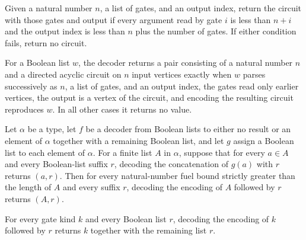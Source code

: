 \begin{definition}
\label{BoolCircuit.DAGCircuit.ofParts}
\leanok
{}
Given a natural number $n$, a list of gates, and an output index, return the circuit
with those gates and output if every argument read by gate $i$ is less than $n+i$ and
the output index is less than $n$ plus the number of gates. If either condition fails,
return no circuit.
\end{definition}

\begin{definition}
\label{BoolCircuit.DAGCircuit.decode}
\leanok
{}
For a Boolean list $w$, the decoder returns a pair consisting of a natural number $n$
and a directed acyclic circuit on $n$ input vertices exactly when $w$ parses
successively as $n$, a list of gates, and an output index, the gates read only earlier
vertices, the output is a vertex of the circuit, and encoding the resulting circuit
reproduces $w$. In all other cases it returns no value.
\end{definition}

\begin{theorem}
\label{BoolCircuit.decodeList_encodeList}
\leanok
{}
Let $\alpha$ be a type, let $f$ be a decoder from Boolean lists to either no result or
an element of $\alpha$ together with a remaining Boolean list, and let $g$ assign a
Boolean list to each element of $\alpha$. For a finite list $A$ in $\alpha$, suppose
that for every $a\in A$ and every Boolean-list suffix $r$, decoding the concatenation of
$g(a)$ with $r$ returns $(a,r)$. Then for every natural-number fuel bound strictly
greater than the length of $A$ and every suffix $r$, decoding the encoding of $A$
followed by $r$ returns $(A,r)$.
\end{theorem}

\begin{theorem}
\label{BoolCircuit.GateKind.decode_encode}
\leanok
{}
For every gate kind $k$ and every Boolean list $r$, decoding the encoding of $k$
followed by $r$ returns $k$ together with the remaining list $r$.
\end{theorem}

